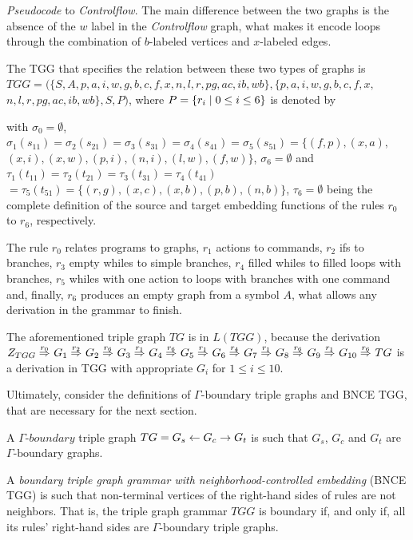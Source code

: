 \begin{example}{\emph{Pseudocode} to \emph{Controlflow}.}
	The main difference between the two graphs is the absence of the $w$ label in the \emph{Controlflow} graph, what makes it encode loops through the combination of $b$-labeled vertices and $x$-labeled edges.
	
	The TGG that specifies the relation between these two types of graphs is $TGG = (\{S, A, p, a, i, w, g, b, c, f, x, n, l, r, pg, ac, ib, wb\}, \{p, a, i, w, g, b, c, f, x,$ $ n, l, r, pg, ac, ib, wb\}, S, P)$, where $P = \{r_i \; | \; 0 \le i \le 6\}$ is denoted by
	
	
	with $\sigma_0 = \emptyset$, $\sigma_1(s_{11}) = \sigma_2(s_{21}) = \sigma_3(s_{31}) = \sigma_4(s_{41}) = \sigma_5(s_{51}) = \{ (f,p), (x,a), $ $(x,i), (x,w), (p,i), (n,i), (l,w), (f,w) \}$, $\sigma_6 = \emptyset$ and $\tau_1(t_{11}) = \tau_2(t_{21}) = \tau_3(t_{31}) = \tau_4(t_{41}) $ $= \tau_5(t_{51}) = \{ (r,g), (x,c), (x,b), (p,b), (n,b)\}$, $\tau_6 = \emptyset$ being the complete definition of the source and target embedding functions of the rules $r_0$ to $r_6$, respectively.
	
	The rule $r_0$ relates programs to graphs, $r_1$ actions to commands, $r_2$ ifs to branches, $r_3$ empty whiles to simple branches, $r_4$ filled whiles to filled loops with branches, $r_5$ whiles with one action to loops with branches with one command and, finally, $r_6$ produces an empty graph from a symbol $A$, what allows any derivation in the grammar to finish.
	
	The aforementioned triple graph $TG$ is in $L(TGG)$, because the derivation
	$
	\startTG{TGG} \tderiv{r_0}{}{} G_1 \tderiv{r_2}{}{} G_2 \tderiv{r_6}{}{} G_3 \tderiv{r_1}{}{} G_4 \tderiv{r_6}{}{} G_5 \tderiv{r_1}{}{} G_6 \tderiv{r_4}{}{} G_7 \tderiv{r_1}{}{} G_8 \tderiv{r_6}{}{} G_9 \tderiv{r_1}{}{} G_{10} \tderiv{r_6}{}{} TG
	$
	is a derivation in TGG with appropriate $G_i$ for $1 \le i \le 10$.
\end{example}


Ultimately, consider the definitions of $\Gamma\text{-boundary}$ triple graphs and BNCE TGG, that are necessary for the next section.

\begin{definition}
	A $\mathit{\Gamma\textit{-boundary}}$ triple graph $TG = G_s \overset{}{\leftarrow} G_c \overset{}{\rightarrow} G_t$ is such that $G_s$, $G_c$ and $G_t$ are $\Gamma\text{-boundary}$ graphs.
\end{definition}

\begin{definition}
	A \emph{boundary triple graph grammar with neighborhood-controlled embedding} (BNCE TGG) is such that non-terminal vertices of the right-hand sides of rules are not neighbors. That is, the triple graph grammar $TGG$ is boundary if, and only if, all its rules' right-hand sides are $\Gamma\text{-boundary}$ triple graphs.
\end{definition}


